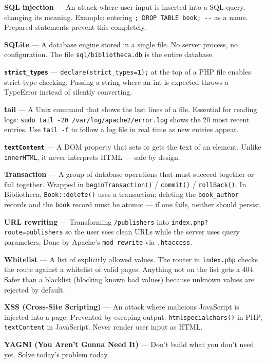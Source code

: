 \documentclass[11pt,a4paper,oneside]{book}
\begin{document}
\textbf{SQL injection} --- An attack where user input is inserted
into a SQL query, changing its meaning. Example: entering
\texttt{\textquotesingle{};\ DROP\ TABLE\ book;\ -\/-} as a name.
Prepared statements prevent this completely.

\textbf{SQLite} --- A database engine stored in a single file. No
server process, no configuration. The file
\texttt{sql/bibliotheca.db} is the entire database.

\textbf{\texttt{strict\_types}} ---
\texttt{declare(strict\_types=1);} at the top of a PHP file
enables strict type checking. Passing a string where an int is
expected throws a TypeError instead of silently converting.

\textbf{tail} --- A Unix command that shows the last lines of a
file. Essential for reading logs:
\texttt{sudo\ tail\ -20\ /var/log/apache2/error.log} shows the 20
most recent entries. Use \texttt{tail\ -f} to follow a log file
in real time as new entries appear.

\textbf{\texttt{textContent}} --- A DOM property that sets or
gets the text of an element. Unlike \texttt{innerHTML}, it never
interprets HTML --- safe by design.

\textbf{Transaction} --- A group of database operations that must
succeed together or fail together. Wrapped in
\texttt{beginTransaction()} / \texttt{commit()} /
\texttt{rollBack()}. In Bibliotheca, \texttt{Book::delete()} uses
a transaction: deleting the \texttt{book\_author} records and the
\texttt{book} record must be atomic --- if one fails, neither
should persist.

\textbf{URL rewriting} --- Transforming \texttt{/publishers} into
\texttt{index.php?route=publishers} so the user sees clean URLs
while the server uses query parameters. Done by Apache's
\texttt{mod\_rewrite} via \texttt{.htaccess}.

\textbf{Whitelist} --- A list of explicitly allowed values. The
router in \texttt{index.php} checks the route against a whitelist
of valid pages. Anything not on the list gets a 404. Safer than a
blacklist (blocking known bad values) because unknown values are
rejected by default.

\textbf{XSS (Cross-Site Scripting)} --- An attack where malicious
JavaScript is injected into a page. Prevented by escaping output:
\texttt{htmlspecialchars()} in PHP, \texttt{textContent} in
JavaScript. Never render user input as HTML.

\textbf{YAGNI (You Aren't Gonna Need It)} --- Don't build what
you don't need yet. Solve today's problem today.
\end{document}
